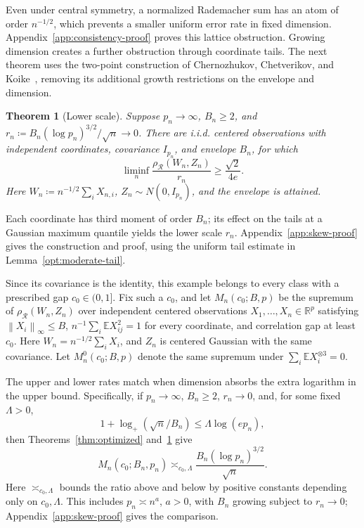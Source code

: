 \documentclass[11pt,letterpaper]{article}
\newtheorem{theorem}{Theorem}
\theoremstyle{remark}
\newcommand{\E}{\mathbb E}
\newcommand{\R}{\mathbb R}
\newcommand{\norm}[1]{\left\lVert#1\right\rVert}
\newcommand{\rh}{\rho_{\mathcal R}}
\begin{document}
Even under central symmetry, a normalized Rademacher sum has an atom
of order \(n^{-1/2}\), which prevents a smaller uniform error rate in
fixed dimension. Appendix~\ref{app:consistency-proof} proves this
lattice obstruction. Growing dimension creates a further obstruction
through coordinate tails. The next theorem uses the two-point
construction of Chernozhukov, Chetverikov, and
Koike~\cite[Proposition~2.1]{CCK}, removing its additional growth
restrictions on the envelope and dimension.
\begin{samepage}
\begin{theorem}[Lower scale]\label{opt:skew-lower}
Suppose \(p_n\to\infty\), \(B_n\ge2\), and
\(r_n\coloneqq B_n(\log p_n)^{3/2}/\sqrt n\to0\). There are i.i.d.
centered observations with independent coordinates, covariance
\(I_{p_n}\), and envelope \(B_n\), for which
\begin{equation}
 \liminf_n\frac{\rh(W_n,Z_n)}{r_n}\ge\frac{\sqrt2}{4e}.
 \label{opt:lower-constant}
\end{equation}
Here \(W_n\coloneqq n^{-1/2}\sum_iX_{n,i}\),
\(Z_n\sim N(0,I_{p_n})\), and the envelope is attained.
\end{theorem}
\end{samepage}
Each coordinate has third moment of order \(B_n\); its effect on the
tails at a Gaussian maximum quantile yields the lower scale \(r_n\).
Appendix~\ref{app:skew-proof} gives the construction and proof, using
the uniform tail estimate in Lemma~\ref{opt:moderate-tail}.

Since its covariance is the identity, this example belongs to every
class with a prescribed gap \(c_0\in(0,1]\). Fix such a \(c_0\), and let
\(M_n(c_0;B,p)\) be the supremum of \(\rh(W_n,Z_n)\) over independent
centered observations \(X_1,\ldots,X_n\in\R^p\) satisfying
\(\norm{X_i}_\infty\le B\),
\(n^{-1}\sum_i\E X_{ij}^2=1\) for every coordinate, and correlation
gap at least \(c_0\). Here \(W_n=n^{-1/2}\sum_iX_i\), and \(Z_n\)
is centered Gaussian with the same covariance. Let \(M_n^0(c_0;B,p)\)
denote the same supremum under \(\sum_i\E X_i^{\otimes3}=0\).

The upper and lower rates match when dimension absorbs the extra
logarithm in the upper bound. Specifically, if \(p_n\to\infty\),
\(B_n\ge2\), \(r_n\to0\), and, for some fixed \(\Lambda>0\),
\[
 1+\log_+(\sqrt n/B_n)\le\Lambda\log(ep_n),
\]
then Theorems~\ref{thm:optimized} and~\ref{opt:skew-lower} give
\begin{equation}
 M_n(c_0;B_n,p_n)\asymp_{c_0,\Lambda}
 \frac{B_n(\log p_n)^{3/2}}{\sqrt n}.
 \label{opt:matching-minimax}
\end{equation}
Here \(\asymp_{c_0,\Lambda}\) bounds the ratio above and below by
positive constants depending only on \(c_0,\Lambda\). This includes
\(p_n\asymp n^a\), \(a>0\), with \(B_n\) growing subject to
\(r_n\to0\); Appendix~\ref{app:skew-proof} gives the comparison.
\end{document}
